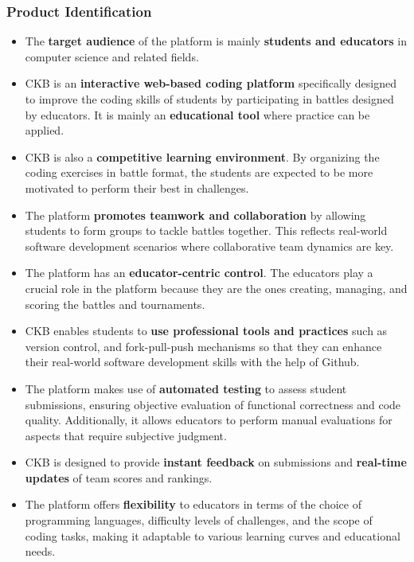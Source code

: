 \subsubsection{Product Identification}

\begin{itemize}

    \item The \textbf{target audience} of the platform is mainly \textbf{students and educators} in computer science and related fields. 
    
    \item CKB is an \textbf{interactive web-based coding platform} specifically designed to improve the coding skills of students by participating in battles designed by educators. It is mainly an \textbf{educational tool} where practice can be applied.

    \item CKB is also a \textbf{competitive learning environment}. By organizing the coding exercises in battle format, the students are expected to be more motivated to perform their best in challenges.

    \item The platform \textbf{promotes teamwork and collaboration} by allowing students to form groups to tackle battles together. This reflects real-world software development scenarios where collaborative team dynamics are key.

    \item The platform has an \textbf{educator-centric control}. The educators play a crucial role in the platform because they are the ones creating, managing, and scoring the battles and tournaments.

    \item CKB enables students to \textbf{use professional tools and practices} such as version control, and fork-pull-push mechanisms so that they can enhance their real-world software development skills with the help of Github.

    \item The platform makes use of \textbf{automated testing} to assess student submissions, ensuring objective evaluation of functional correctness and code quality. Additionally, it allows educators to perform manual evaluations for aspects that require subjective judgment.

    \item CKB is designed to provide \textbf{instant feedback} on submissions and \textbf{real-time updates} of team scores and rankings.

    \item The platform offers \textbf{flexibility} to educators in terms of the choice of programming languages, difficulty levels of challenges, and the scope of coding tasks, making it adaptable to various learning curves and educational needs.

    
\end{itemize}

